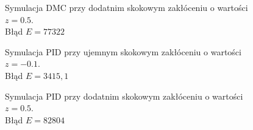 \begin{figure}[ht]
\centering

\caption{Symulacja DMC przy dodatnim skokowym zakłóceniu o wartości $ z=\num{0,5}$.\\Błąd $ E=\num{77 322} $}
\label{Z7b}
\end{figure}

\begin{figure}[ht]
\centering

\caption{Symulacja PID przy ujemnym skokowym zakłóceniu o wartości $ z=\num{-0,1}$.\\Błąd $ E=3415,1 $ }
\label{Z7c}
\end{figure}

\begin{figure}[ht]
\centering

\caption{Symulacja PID przy dodatnim skokowym zakłóceniu o wartości $ z=\num{0,5}$.\\Błąd $ E=\num{82 804} $}
\label{Z7d}
\end{figure}

